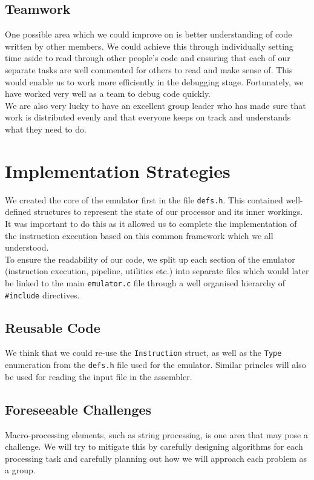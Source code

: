 \documentclass[11pt]{article}
\begin{document}
\subsection{Teamwork}
One possible area which we could improve on is better understanding of code written by other members. We could achieve this through individually setting time aside to read through other people's code and ensuring that each of our separate tasks are well commented for others to read and make sense of. This would enable us to work more efficiently in the debugging stage. Fortunately, we have worked very well as a team to debug code quickly.\\

We are also very lucky to have an excellent group leader who has made sure that work is distributed evenly and that everyone keeps on track and understands what they need to do.

\section{Implementation Strategies}
We created the core of the emulator first in the file \texttt{defs.h}. This contained well-defined structures to represent the state of our processor and its inner workings. It was important to do this as it allowed us to complete the implementation of the instruction execution based on this common framework which we all understood.\\

To ensure the readability of our code, we split up each section of the emulator (instruction execution, pipeline, utilities etc.) into separate files which would later be linked to the main \texttt{emulator.c} file through a well organised hierarchy of \texttt{{\#}include} directives.

\subsection{Reusable Code}

We think that we could re-use the \texttt{Instruction} struct, as well as the \texttt{Type} enumeration from the \texttt{defs.h} file used for the emulator. Similar princles will also be used for reading the input file in the assembler.

\subsection{Foreseeable Challenges}
Macro-processing elements, such as string processing, is one area that may pose a challenge. We will try to mitigate this by carefully designing algorithms for each processing task and carefully planning out how we will approach each problem as a group.
\end{document}
